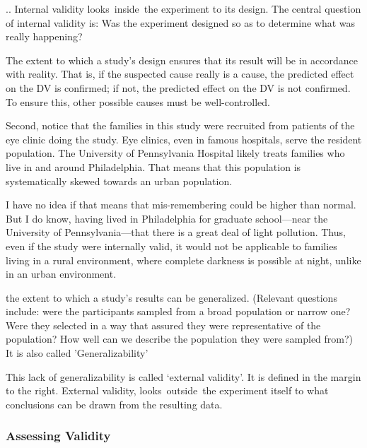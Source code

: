 \begin{refsection}
.. Internal validity looks inside the experiment to its design. The central question of internal validity is: Was the experiment designed so as to determine what was really happening?
\begin{thesis}
The extent to which a study's design ensures that its result will be in accordance with reality. That is, if the suspected cause really is a cause, the predicted effect on the DV is confirmed; if not, the predicted effect on the DV is not confirmed. To ensure this, other possible causes must be well-controlled.
\end{thesis}

Second, notice that the families in this study were recruited from patients of the eye clinic doing the study. Eye clinics, even in famous hospitals, serve the resident population. The University of Pennsylvania Hospital likely treats families who live in and around Philadelphia. That means that this population is systematically skewed towards an urban population.

I have no idea if that means that mis-remembering could be higher than normal. But I do know, having lived in Philadelphia for graduate school---near the University of Pennsylvania---that there is a great deal of light pollution. Thus, even if the study were internally valid, it would not be applicable to families living in a rural environment, where complete darkness is possible at night, unlike in an urban environment.\begin{thesis}
the extent to which a study's results can be generalized. (Relevant questions include: were the participants sampled from a broad population or narrow one? Were they selected in a way that assured they were representative of the population? How well can we describe the population they were sampled from?)\newline
It is also called 'Generalizability'
\end{thesis}

This lack of generalizability is called `external validity'. It is defined in the margin to the right. External validity, looks outside the experiment itself to what conclusions can be drawn from the resulting data.

\subsubsection{Assessing Validity}
\label{assessingvalidity}


\end{refsection}
